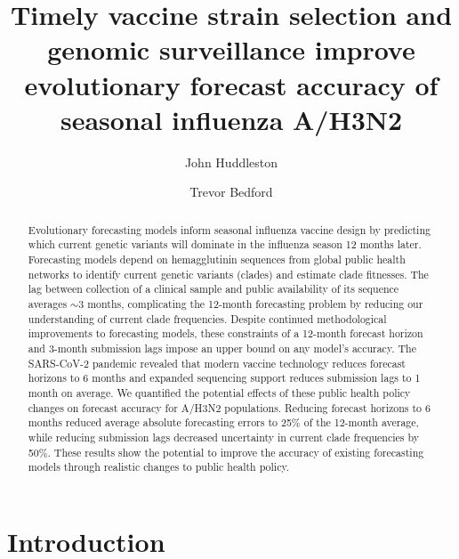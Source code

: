 \documentclass[9pt,lineno]{elife}
\title{Timely vaccine strain selection and genomic surveillance improve evolutionary forecast accuracy of seasonal influenza A/H3N2}
\author[1*]{John Huddleston}
\author[1,2]{Trevor Bedford}
\affil[1]{Vaccine and Infectious Disease Division, Fred Hutchinson Cancer Center, Seattle, WA, USA}
\affil[2]{Howard Hughes Medical Institute, Seattle, WA, USA}
\begin{document}
\maketitle

\begin{abstract}
Evolutionary forecasting models inform seasonal influenza vaccine design by predicting which current genetic variants will dominate in the influenza season 12 months later.
Forecasting models depend on hemagglutinin sequences from global public health networks to identify current genetic variants (clades) and estimate clade fitnesses.
The lag between collection of a clinical sample and public availability of its sequence averages $\sim$3 months, complicating the 12-month forecasting problem by reducing our understanding of current clade frequencies.
Despite continued methodological improvements to forecasting models, these constraints of a 12-month forecast horizon and 3-month submission lags impose an upper bound on any model's accuracy.
The SARS-CoV-2 pandemic revealed that modern vaccine technology reduces forecast horizons to 6 months and expanded sequencing support reduces submission lags to 1 month on average.
We quantified the potential effects of these public health policy changes on forecast accuracy for A/H3N2 populations.
Reducing forecast horizons to 6 months reduced average absolute forecasting errors to 25\% of the 12-month average, while reducing submission lags decreased uncertainty in current clade frequencies by 50\%.
These results show the potential to improve the accuracy of existing forecasting models through realistic changes to public health policy.

\end{abstract}

\section{Introduction}
\end{document}
